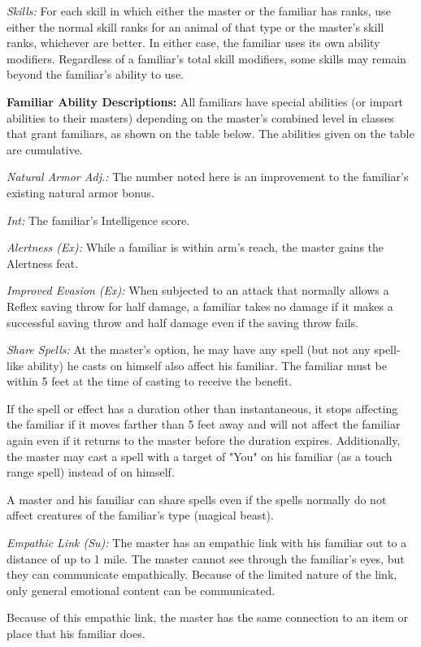 \textit{Skills:} For each skill in which either the master or the familiar has ranks, use either the normal skill ranks for an animal of that type or the master's skill ranks, whichever are better. In either case, the familiar uses its own ability modifiers. Regardless of a familiar's total skill modifiers, some skills may remain beyond the familiar's ability to use.

\textbf{Familiar Ability Descriptions:} All familiars have special abilities (or impart abilities to their masters) depending on the master's combined level in classes that grant familiars, as shown on the table below. The abilities given on the table are cumulative. 

\textit{Natural Armor Adj.:} The number noted here is an improvement to the familiar's existing natural armor bonus.

\textit{Int:} The familiar's Intelligence score.

\textit{Alertness (Ex):} While a familiar is within arm's reach, the master gains the Alertness feat.

\textit{Improved Evasion (Ex):} When subjected to an attack that normally allows a Reflex saving throw for half damage, a familiar takes no damage if it makes a successful saving throw and half damage even if the saving throw fails.

\textit{Share Spells:} At the master's option, he may have any spell (but not any spell-like ability) he casts on himself also affect his familiar. The familiar must be within 5 feet at the time of casting to receive the benefit.

If the spell or effect has a duration other than instantaneous, it stops affecting the familiar if it moves farther than 5 feet away and will not affect the familiar again even if it returns to the master before the duration expires. Additionally, the master may cast a spell with a target of "You" on his familiar (as a touch range spell) instead of on himself.

A master and his familiar can share spells even if the spells normally do not affect creatures of the familiar's type (magical beast).

\textit{Empathic Link (Su):} The master has an empathic link with his familiar out to a distance of up to 1 mile. The master cannot see through the familiar's eyes, but they can communicate empathically. Because of the limited nature of the link, only general emotional content can be communicated.

Because of this empathic link, the master has the same connection to an item or place that his familiar does.


